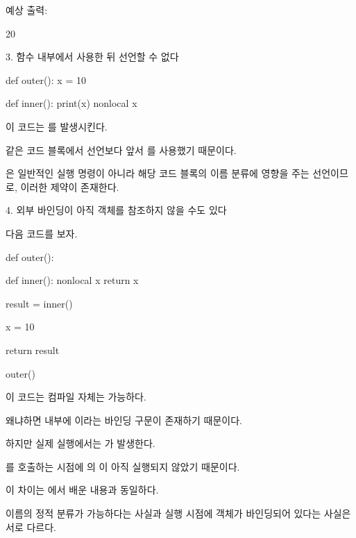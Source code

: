 예상 출력:

\begin{dhkzsh}
20
\end{dhkzsh}

\begin{dhknote}
\begin{dhksmry}[centered]
3. 함수 내부에서 사용한 뒤 선언할 수 없다
\end{dhksmry}
\end{dhknote}

\begin{dhkcode}
def outer():
    x = 10

    def inner():
        print(x)
        nonlocal x
\end{dhkcode}

이 코드는 를 발생시킨다.

같은 코드 블록에서  선언보다 앞서 를 사용했기 때문이다.

은 일반적인 실행 명령이 아니라 해당 코드 블록의 이름 분류에 영향을 주는 선언이므로, 이러한 제약이 존재한다.

\begin{dhknote}
\begin{dhksmry}[centered]
4. 외부 바인딩이 아직 객체를 참조하지 않을 수도 있다
\end{dhksmry}
\end{dhknote}

다음 코드를 보자.

\begin{dhkcode}
def outer():

    def inner():
        nonlocal x
        return x

    result = inner()

    x = 10

    return result


outer()
\end{dhkcode}

이 코드는 컴파일 자체는 가능하다.

왜냐하면  내부에 이라는 바인딩 구문이 존재하기 때문이다.

하지만 실제 실행에서는 가 발생한다.

를 호출하는 시점에 의 이 아직 실행되지 않았기 때문이다.

이 차이는 에서 배운 내용과 동일하다.

이름의 정적 분류가 가능하다는 사실과 실행 시점에 객체가 바인딩되어 있다는 사실은 서로 다르다.

